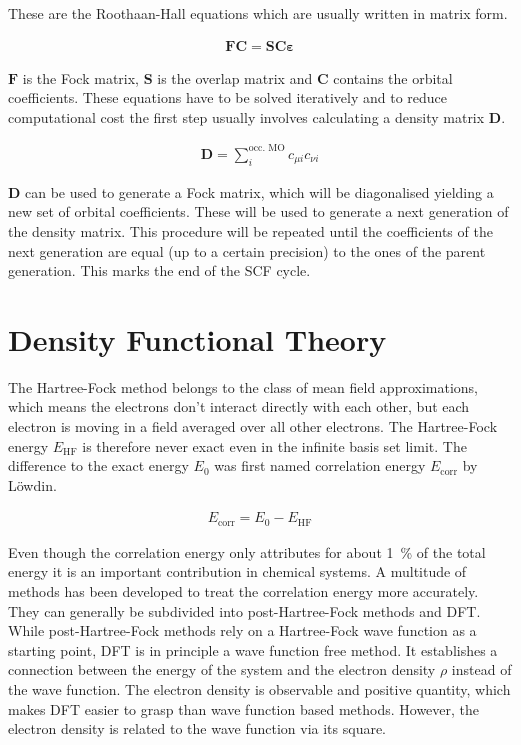These are the Roothaan-Hall equations which are usually written in matrix form.

\begin{align}
    \mathbf{FC}=\mathbf{SC\varepsilon}
\end{align}

$\mathbf{F}$ is the Fock matrix, $\mathbf{S}$ is the overlap matrix and
$\mathbf{C}$ contains the orbital coefficients. These equations have to be solved iteratively and to reduce computational cost the first step usually involves calculating a density matrix $\mathbf{D}$.

\begin{align}
    \mathbf{D}=\sum_{i}^\text{occ. MO} c_{\mu i}c_{\nu i}
\end{align}

$\mathbf{D}$ can be used to generate a Fock matrix, which will be diagonalised
yielding a new set of orbital coefficients. These will be used to generate a
next generation of the density matrix. This procedure will be repeated until
the coefficients of the next generation are equal (up to a certain precision)
to the ones of the parent generation. This marks the end of the \ac{SCF} cycle.

\section{Density Functional Theory}
\label{sec:dft}

The Hartree-Fock method belongs to the class of mean field approximations,
which means the electrons don't interact directly with each other, but each
electron is moving in a field averaged over all other electrons. The
Hartree-Fock energy $E_\text{HF}$ is therefore never exact even in the infinite
basis set limit. The difference to the exact energy $E_0$ was first named
correlation energy $E_\text{corr}$ by
L\"owdin\autocite{lowdin_correlation_1958}.

\begin{align}
    E_\text{corr} = E_0 - E_\text{HF}
\end{align}

Even though the correlation energy only attributes for about \SI{1}{\percent}
of the total energy it is an important contribution in chemical systems. A
multitude of methods has been developed to treat the correlation energy more
accurately. They can generally be subdivided into post-Hartree-Fock methods and
\ac{DFT}. While post-Hartree-Fock methods rely on a Hartree-Fock wave function
as a starting point, \ac{DFT} is in principle a wave function free method. It
establishes a connection between the energy of the system and the electron
density $\rho$ instead of the wave function. The electron density is observable and
positive quantity, which makes \ac{DFT} easier to grasp than wave function
based methods. However, the electron density is related to the wave function
via its square. 

